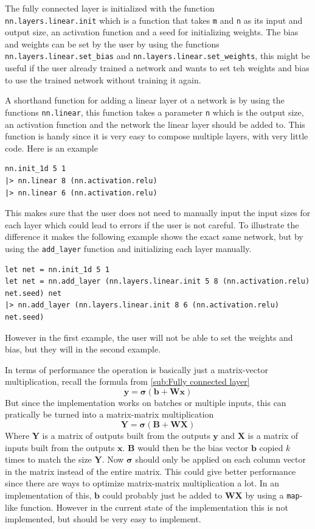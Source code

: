 The fully connected layer is initialized with the function\\ \texttt{nn.layers.linear.init} which is a function that takes \texttt{m} and \texttt{n} as its input and output size, an activation function and a seed for initializing weights.
The bias and weights can be set by the user by using the functions\\ \texttt{nn.layers.linear.set\_bias} and \texttt{nn.layers.linear.set\_weights}, this might be useful if the user already trained a network and wants to set teh weights and bias to use the trained network without training it again.

A shorthand function for adding a linear layer ot a network is by using the functions \texttt{nn.linear}, this function takes a parameter \texttt{n} which is the output size, an activation function and the network the linear layer should be added to. This function is handy since it is very easy to compose multiple layers, with very little code. Here is an example

\begin{lstlisting}
nn.init_1d 5 1
|> nn.linear 8 (nn.activation.relu)
|> nn.linear 6 (nn.activation.relu)
\end{lstlisting}

This makes sure that the user does not need to manually input the input sizes for each layer which could lead to errors if the user is not careful.
To illustrate the difference it makes the following example shows the exact same network, but by using the \texttt{add\_layer} function and initializing each layer manually.

\begin{lstlisting}
let net = nn.init_1d 5 1
let net = nn.add_layer (nn.layers.linear.init 5 8 (nn.activation.relu) net.seed) net
|> nn.add_layer (nn.layers.linear.init 8 6 (nn.activation.relu) net.seed)
\end{lstlisting}

However in the first example, the user will not be able to set the weights and bias, but they will in the second example.

In terms of performance the operation is basically just a matrix-vector multiplication, recall the formula from \autoref{sub:Fully connected layer}
$$\bm{y} = \bm{\sigma} \left( \bm{b} + \bm{W} \bm{x} \right)$$
But since the implementation works on batches or multiple inputs, this can pratically be turned into a matrix-matrix multiplication
$$\bm{Y} = \bm{\sigma} \left( \bm{B} + \bm{W} \bm{X} \right)$$
Where $\bm{Y}$ is a matrix of outputs built from the outputs $\bm{y}$ and $\bm{X}$ is a matrix of inputs built from the outputs $\bm{x}$. $\bm{B}$ would then be the bias vector $\bm{b}$ copied $k$ times to match the size $\bm{Y}$.
Now $\bm{\sigma}$ should only be applied on each column vector in the matrix instead of the entire matrix.
This could give better performance since there are ways to optimize matrix-matrix multiplication a lot.
In an implementation of this, $\bm{b}$ could probably just be added to $\bm{WX}$ by using a \texttt{map}-like function.
However in the current state of the implementation this is not implemented, but should be very easy to implement.

